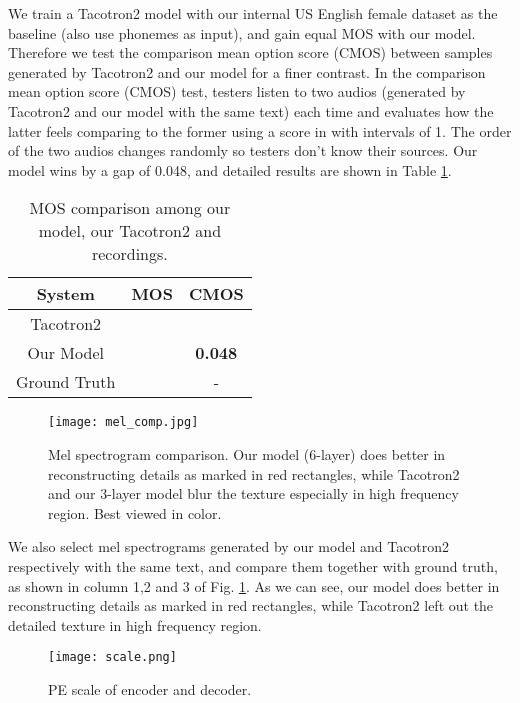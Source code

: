 \documentclass[letterpaper]{article} \usepackage{aaai19}  \usepackage{times}  \usepackage{helvet}  \usepackage{courier}  \usepackage{url}  \usepackage{graphicx}  \frenchspacing
\begin{document}
We train a Tacotron2 model with our internal US English female dataset as the baseline (also use phonemes as input), and gain equal MOS with our model. Therefore we test the comparison mean option score (CMOS) between samples generated by Tacotron2 and our model for a finer contrast. In the comparison mean option score (CMOS) test, testers listen to two audios (generated by Tacotron2 and our model with the same text) each time and evaluates how the latter feels comparing to the former using a score in  with intervals of 1. The order of the two audios changes randomly so testers don't know their sources. Our model wins by a gap of 0.048, and detailed results are shown in Table \ref{tab:mos_system}.

\begin{table}[t!]
  \centering
  \begin{tabular}{ccc}
    \toprule
    System     &   MOS &   CMOS  \\
    \midrule
    Tacotron2           &    &   \\
    Our Model           &    &   \textbf{0.048}\\
    \midrule
    Ground Truth        &    &   -\\
    \bottomrule
  \end{tabular}
  \caption{MOS comparison among our model, our Tacotron2 and recordings.}
  \label{tab:mos_system}
\end{table}

\begin{figure}[t!]
  \centering
  \texttt{[image: mel\_comp.jpg]}
  \caption{Mel spectrogram comparison. Our model (6-layer) does better in reconstructing details as marked in red rectangles, while Tacotron2 and our 3-layer model blur the texture especially in high frequency region. Best viewed in color.}
  \label{fig:mel_comp}
\end{figure}

We also select mel spectrograms generated by our model and Tacotron2 respectively with the same text, and compare them together with ground truth, as shown in column 1,2 and 3 of Fig. \ref{fig:mel_comp}. As we can see, our model does better in reconstructing details as marked in red rectangles, while Tacotron2 left out the detailed texture in high frequency region.

\begin{figure}[t!]
  \centering
  \texttt{[image: scale.png]}
  \caption{PE scale of encoder and decoder.}
  \label{fig:pe_scale}
\end{figure}
\end{document}
